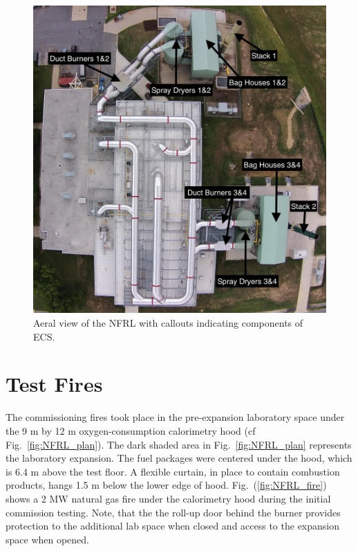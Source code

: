 \documentclass[12pt,oneside]{book}
\begin{document}
\begin{figure}[!ht]
\centering
\includegraphics[width=.8\textwidth]{../Figures/nfrl_roof}
\caption {Aeral view of the NFRL with callouts indicating components of ECS.}
\label{fig:NFRL_roof}
\end{figure}


\chapter{Test Fires}
\label{test_fire}
The commissioning fires took place in the pre-expansion laboratory space under the 9 m by 12 m oxygen-consumption calorimetry hood (cf Fig.~\ref{fig:NFRL_plan}). The dark shaded area in Fig.~\ref{fig:NFRL_plan} represents the laboratory expansion. The fuel packages were centered under the hood, which is 6.4 m above the test floor. A flexible curtain, in place to contain combustion products, hangs 1.5 m below the lower edge of hood. Fig.~(\ref{fig:NFRL_fire}) shows a 2 MW natural gas fire under the calorimetry hood during the initial commission testing. Note, that the the roll-up door behind the burner provides protection to the additional lab space when closed and access to the expansion space when opened.
\end{document}
